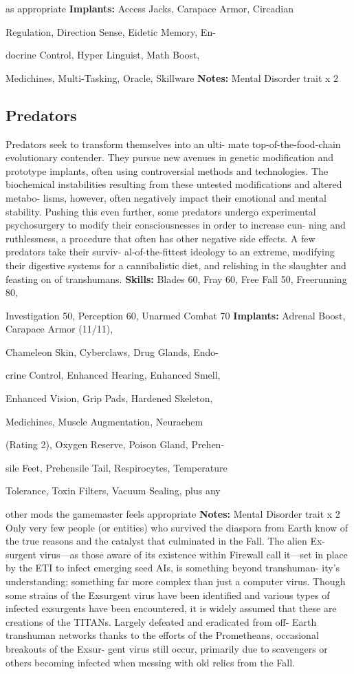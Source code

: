 as appropriate
\textbf{Implants:} Access Jacks, Carapace Armor, Circadian 

Regulation, Direction Sense, Eidetic Memory, En-

docrine Control, Hyper Linguist, Math Boost, 

Medichines, Multi-Tasking, Oracle, Skillware
\textbf{Notes:} Mental Disorder trait x 2

\subsection{Predators}

Predators seek to transform themselves into an ulti-
mate top-of-the-food-chain evolutionary contender. 
They pursue new avenues in genetic modification and 
prototype implants, often using controversial methods 
and technologies. The biochemical instabilities resulting 
from these untested modifications and altered metabo-
lisms, however, often negatively impact their emotional 
and mental stability. Pushing this even further, some 
predators undergo experimental psychosurgery to 
modify their consciousnesses in order to increase cun-
ning and ruthlessness, a procedure that often has other 
negative side effects. A few predators take their surviv-
al-of-the-fittest ideology to an extreme, modifying their 
digestive systems for a cannibalistic diet, and relishing 
in the slaughter and feasting on of transhumans.
\textbf{Skills:} Blades 60, Fray 60, Free Fall 50, Freerunning 80, 

Investigation 50, Perception 60, Unarmed Combat 70
\textbf{Implants:} Adrenal Boost, Carapace Armor (11/11), 

Chameleon Skin, Cyberclaws, Drug Glands, Endo-

crine Control, Enhanced Hearing, Enhanced Smell, 

Enhanced Vision, Grip Pads, Hardened Skeleton, 

Medichines, Muscle Augmentation, Neurachem 

(Rating 2), Oxygen Reserve, Poison Gland, Prehen-

sile Feet, Prehensile Tail, Respirocytes, Temperature 

Tolerance, Toxin Filters, Vacuum Sealing, plus any 

other mods the gamemaster feels appropriate
\textbf{Notes:} Mental Disorder trait x 2
Only very few people (or entities) who survived the 
diaspora from Earth know of the true reasons and 
the catalyst that culminated in the Fall. The alien Ex-
surgent virus—as those aware of its existence within 
Firewall call it—set in place by the ETI to infect 
emerging seed AIs, is something beyond transhuman-
ity's understanding; something far more complex 
than just a computer virus. Though some strains of 
the Exsurgent virus have been identified and various 
types of infected exsurgents have been encountered, 
it is widely assumed that these are creations of the 
TITANs. Largely defeated and eradicated from off-
Earth transhuman networks thanks to the efforts of 
the Prometheans, occasional breakouts of the Exsur-
gent virus still occur, primarily due to scavengers or 
others becoming infected when messing with old relics 
from the Fall.

